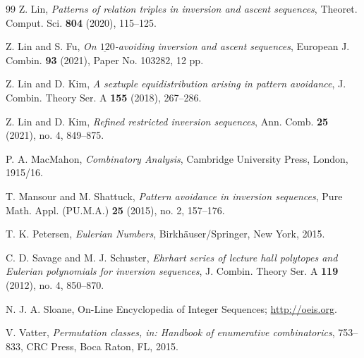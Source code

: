 \documentclass[reqno]{amsart}
\numberwithin{equation}{section}
\theoremstyle{plain}
\theoremstyle{definition}
\theoremstyle{named}
\begin{document}
\begin{thebibliography}{99}
	{\sc Z. Lin}, {\em Patterns of relation triples in inversion and ascent sequences}, Theoret. Comput. Sci. {\bf804} (2020), 115--125.

	{\sc Z. Lin and S. Fu}, {\em On $\underline{12}0$-avoiding inversion and ascent sequences}, European J. Combin. {\bf93} (2021), Paper No. 103282, 12 pp.
	
	{\sc Z. Lin and D. Kim}, {\em A sextuple equidistribution arising in pattern avoidance}, J. Combin. Theory Ser. A {\bf155} (2018), 267--286.
	
	{\sc Z. Lin and D. Kim}, {\em Refined restricted inversion sequences}, Ann. Comb. {\bf25} (2021), no. 4, 849--875.
	
	{\sc P. A. MacMahon}, {\em Combinatory Analysis}, Cambridge University Press, London, 1915/16.
	
	{\sc T. Mansour and M. Shattuck}, {\em Pattern avoidance in inversion sequences}, Pure Math. Appl. (PU.M.A.) {\bf25} (2015), no. 2, 157--176.
	
	{\sc T. K. Petersen}, {\em Eulerian Numbers}, Birkhäuser/Springer, New York, 2015.
	
	{\sc C. D. Savage and M. J. Schuster},
	{\em Ehrhart series of lecture hall polytopes and Eulerian polynomials for inversion sequences}, J. Combin. Theory Ser. A {\bf119} (2012), no. 4, 850--870.
	
	{\sc N. J. A. Sloane}, On-Line Encyclopedia of Integer Sequences; \url{http://oeis.org}.
	
	{\sc V. Vatter}, {\em Permutation classes, in: Handbook of enumerative combinatorics}, 753--833, CRC Press, Boca Raton, FL, 2015.

\end{thebibliography}
\end{document}
